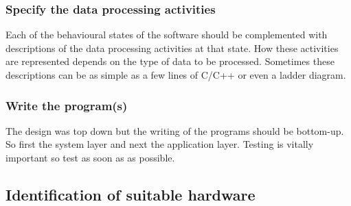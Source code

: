 \documentclass[../main.tex]{subfiles}
\begin{document}
\subsubsection{Specify the data processing activities}
\label{sss:activities}
Each of the behavioural states of the software should be complemented with descriptions of the data processing activities at that state.
How these activities are represented depends on the type of data to be processed.
Sometimes these descriptions can be as simple as a few lines of C/C++ or even a ladder diagram.


\subsubsection{Write the program(s)}
\label{sss:write}
The design was top down but the writing of the programs should be bottom-up. So first the system layer and next the application layer. 
Testing is vitally important so test as soon as as possible.

\subsection{Identification of suitable hardware}
\end{document}
